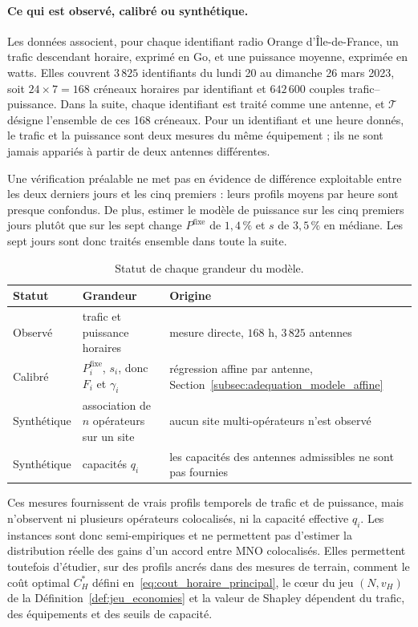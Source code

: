 \paragraph{Ce qui est observé, calibré ou synthétique.}
Les données associent, pour chaque identifiant radio Orange d'Île-de-France,
un trafic descendant horaire, exprimé en Go, et une puissance moyenne,
exprimée en watts. Elles couvrent \(3\,825\) identifiants du lundi 20 au
dimanche 26 mars 2023, soit \(24\times7=168\) créneaux horaires par identifiant et
\(642\,600\) couples trafic--puissance. Dans la suite, chaque identifiant est
traité comme une antenne, et \(\mathcal T\) désigne l'ensemble de ces 168
créneaux. Pour un identifiant et une heure donnés, le trafic et la puissance
sont deux mesures du même équipement ; ils ne sont jamais appariés à partir
de deux antennes différentes.

Une vérification préalable ne met pas en évidence de différence exploitable
entre les deux derniers jours et les cinq premiers : leurs profils moyens par
heure sont presque confondus. De plus, estimer le modèle de puissance sur les
cinq premiers jours plutôt que sur les sept change \(P^{\mathrm{fixe}}\) de
\(1{,}4\,\%\) et \(s\) de \(3{,}5\,\%\) en médiane. Les sept jours sont donc
traités ensemble dans toute la suite.

\begin{table}[htbp]
\centering
\small
\begin{tabular}{p{}p{}p{}}
\hline
Statut & Grandeur & Origine \\
\hline
Observé & trafic et puissance horaires & mesure directe, \(168\) h, \(3\,825\) antennes \\
Calibré & \(P_i^{\mathrm{fixe}}\), \(s_i\), donc \(F_i\) et \(\gamma_i\) &
régression affine par antenne, Section~\ref{subsec:adequation_modele_affine} \\
Synthétique & association de \(n\) opérateurs sur un site & aucun site
multi-opérateurs n'est observé \\
Synthétique & capacités \(q_i\) & les capacités des antennes admissibles ne
sont pas fournies \\
\hline
\end{tabular}
\caption{Statut de chaque grandeur du modèle.}
\label{tab:statut_grandeurs}
\end{table}

Ces mesures fournissent de vrais profils temporels de trafic et de puissance,
mais n'observent ni plusieurs opérateurs colocalisés, ni la capacité effective $q_i$.
Les instances sont donc semi-empiriques et ne permettent
pas d'estimer la distribution réelle des gains d'un accord entre MNO colocalisés.
Elles permettent toutefois d'étudier, sur des profils ancrés dans des mesures de
terrain, comment le coût optimal \(C_H^*\) défini
en~\eqref{eq:cout_horaire_principal}, le cœur du jeu \((N,v_H)\) de la
Définition~\ref{def:jeu_economies} et la valeur de Shapley dépendent du
trafic, des équipements et des seuils de capacité.

